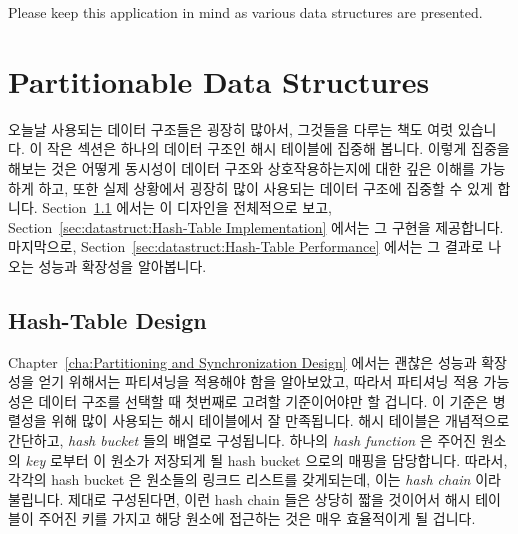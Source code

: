 Please keep this application in mind as various data structures are presented.
\fi

\section{Partitionable Data Structures}
\label{sec:datastruct:Partitionable Data Structures}

오늘날 사용되는 데이터 구조들은 굉장히 많아서, 그것들을 다루는 책도 여럿
있습니다.
이 작은 섹션은 하나의 데이터 구조인 해시 테이블에 집중해 봅니다.
이렇게 집중을 해보는 것은 어떻게 동시성이 데이터 구조와 상호작용하는지에 대한
깊은 이해를 가능하게 하고, 또한 실제 상황에서 굉장히 많이 사용되는 데이터
구조에 집중할 수 있게 합니다.
Section~\ref{sec:datastruct:Hash-Table Design} 에서는 이 디자인을 전체적으로
보고,
Section~\ref{sec:datastruct:Hash-Table Implementation} 에서는 그 구현을
제공합니다.
마지막으로,
Section~\ref{sec:datastruct:Hash-Table Performance} 에서는 그 결과로 나오는
성능과 확장성을 알아봅니다.

\subsection{Hash-Table Design}
\label{sec:datastruct:Hash-Table Design}

Chapter~\ref{cha:Partitioning and Synchronization Design}
에서는 괜찮은 성능과 확장성을 얻기 위해서는 파티셔닝을 적용해야 함을
알아보았고, 따라서 파티셔닝 적용 가능성은 데이터 구조를 선택할 때 첫번째로
고려할 기준이어야만 할 겁니다.
이 기준은 병렬성을 위해 많이 사용되는 해시 테이블에서 잘 만족됩니다.
해시 테이블은 개념적으로 간단하고, \emph{hash bucket} 들의 배열로 구성됩니다.
하나의 \emph{hash function} 은 주어진 원소의 \emph{key} 로부터 이 원소가
저장되게 될 hash bucket 으로의 매핑을 담당합니다.
따라서, 각각의 hash bucket 은 원소들의 링크드 리스트를 갖게되는데, 이는
\emph{hash chain} 이라 불립니다.
제대로 구성된다면, 이런 hash chain 들은 상당히 짧을 것이어서 해시 테이블이
주어진 키를 가지고 해당 원소에 접근하는 것은 매우 효율적이게 될 겁니다.
\iffalse

